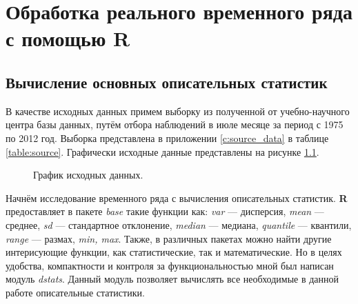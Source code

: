\newpage

\chapter{Обработка реального временного ряда с помощью R}

\section{Вычисление основных описательных статистик} %
\label{sec:dstats}

В качестве исходных данных примем выборку из полученной от учебно-научного центра базы данных, путём отбора наблюдений в июле месяце за период с 1975 по 2012 год. Выборка представлена в приложении \ref{c:source_data} в таблице \ref{table:source}. Графически исходные данные представлены на рисунке \ref{img:input}.

\begin{figure}[ht]
\caption{График исходных данных.}
\label{img:input}
\end{figure}

Начнём исследование временного ряда с вычисления описательных статистик. \textbf{R} предоставляет в пакете \textit{base} такие функции как: \textit{var} --- дисперсия, \textit{mean} --- среднее, \textit{sd} --- стандартное отклонение, \textit{median} --- медиана, \textit{quantile} --- квантили, \textit{range} --- размах, \textit{min, max}. Также, в различных пакетах можно найти другие интерисующие функции, как статистические, так и математические. Но в целях удобства, компактности и контроля за функциональностью мной был написан модуль \textit{dstats}. Данный модуль позволяет вычислять все необходимые в данной работе описательные статистики. 
	
